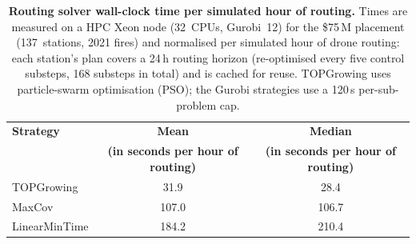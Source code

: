 \begin{table}[!t]
\caption{\textbf{Routing solver wall-clock time per simulated hour of routing.}
Times are measured on a HPC Xeon node (32~CPUs, Gurobi~12) for the \$75\,M placement
(137~stations, 2021 fires) and normalised per simulated hour of drone routing: each station's
plan covers a 24\,h routing horizon (re-optimised every five control substeps, 168 substeps in
total) and is cached for reuse.
TOPGrowing uses particle-swarm optimisation (PSO); the Gurobi strategies use a 120\,s
per-sub-problem cap.}
\label{tab:routing_runtimes}
\footnotesize
\begin{tabular*}{\textwidth}{@{\extracolsep{\fill}}lcc@{}}
\toprule
\textbf{Strategy} & \textbf{Mean} & \textbf{Median} \\
                  & \textbf{(in seconds per hour of routing)} & \textbf{(in seconds per hour of routing)} \\
\midrule
  TOPGrowing    & 31.9 & 28.4 \\
  MaxCov        & 107.0 & 106.7 \\
  LinearMinTime & 184.2 & 210.4 \\
\bottomrule
\end{tabular*}
\end{table}
